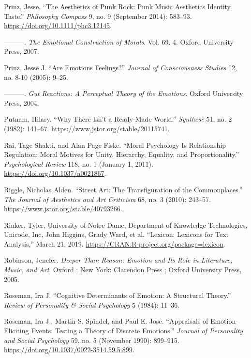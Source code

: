 \documentclass[phdthesis,12pt,final]{wuthesis}
\newlength{\cslhangindent}
\newenvironment{CSLReferences}[2] %
{\begin{list}{}{%
	\setlength{\itemindent}{0pt}
	\setlength{\leftmargin}{0pt}
	\setlength{\parsep}{0pt}
	\ifodd #1
	\setlength{\leftmargin}{\cslhangindent}
	\setlength{\itemindent}{-1\cslhangindent}
	\fi
	\setlength{\itemsep}{#2\baselineskip}}}
{\end{list}}
\theoremstyle{definition}
\theoremstyle{definition}
\theoremstyle{definition}
\theoremstyle{definition}
\theoremstyle{remark}
\begin{document}
\begin{CSLReferences}{1}{0}
Prinz, Jesse. {``The {Aesthetics} of {Punk Rock}: {Punk Music Aesthetics Identity Taste}.''} \emph{Philosophy Compass} 9, no. 9 (September 2014): 583--93. \url{https://doi.org/10.1111/phc3.12145}.

---------. \emph{The {Emotional Construction} of {Morals}}. Vol. 69. 4. Oxford University Press, 2007.

Prinz, Jesse J. {``Are Emotions Feelings?''} \emph{Journal of Consciousness Studies} 12, no. 8-10 (2005): 9--25.

---------. \emph{Gut {Reactions}: {A Perceptual Theory} of the {Emotions}}. Oxford University Press, 2004.

Putnam, Hilary. {``Why {There Isn}'t a {Ready-Made World}.''} \emph{Synthese} 51, no. 2 (1982): 141--67. \url{https://www.jstor.org/stable/20115741}.

Rai, Tage Shakti, and Alan Page Fiske. {``Moral Psychology Is Relationship Regulation: Moral Motives for Unity, Hierarchy, Equality, and Proportionality.''} \emph{Psychological Review} 118, no. 1 (January 1, 2011). \url{https://doi.org/10.1037/a0021867}.

Riggle, Nicholas Alden. {``Street {Art}: {The Transfiguration} of the {Commonplaces}.''} \emph{The Journal of Aesthetics and Art Criticism} 68, no. 3 (2010): 243--57. \url{https://www.jstor.org/stable/40793266}.

Rinker, Tyler, University of Notre Dame, Department of Knowledge Technologies, Unicode, Inc, John Higgins, Grady Ward, et al. {``Lexicon: {Lexicons} for {Text Analysis},''} March 21, 2019. \url{https://CRAN.R-project.org/package=lexicon}.

Robinson, Jenefer. \emph{Deeper Than Reason: Emotion and Its Role in Literature, Music, and Art}. Oxford : New York: Clarendon Press ; Oxford University Press, 2005.

Roseman, Ira J. {``Cognitive Determinants of Emotion: {A} Structural Theory.''} \emph{Review of Personality \& Social Psychology} 5 (1984): 11--36.

Roseman, Ira J., Martin S. Spindel, and Paul E. Jose. {``Appraisals of Emotion-Eliciting Events: {Testing} a Theory of Discrete Emotions.''} \emph{Journal of Personality and Social Psychology} 59, no. 5 (November 1990): 899--915. \url{https://doi.org/10.1037/0022-3514.59.5.899}.


\end{CSLReferences}
\end{document}
